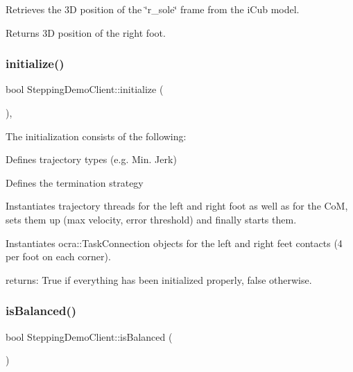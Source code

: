 Retrieves the 3D position of the \char`\"{}r\+\_\+sole\char`\"{} frame from the i\+Cub model.

\begin{DoxyReturn}{Returns}
3D position of the right foot. 
\end{DoxyReturn}
\hypertarget{classSteppingDemoClient_a08dce195eece162eed175ac9487667c2}{}\label{classSteppingDemoClient_a08dce195eece162eed175ac9487667c2} 
\subsubsection{\texorpdfstring{initialize()}{initialize()}}
{\footnotesize\ttfamily bool Stepping\+Demo\+Client\+::initialize (\begin{DoxyParamCaption}{ }\end{DoxyParamCaption})\hspace{0.3cm}{\ttfamily [protected]}, {\ttfamily [virtual]}}

The initialization consists of the following\+:
\begin{DoxyEnumerate}
\item Defines trajectory types (e.\+g. Min. Jerk)
\item Defines the termination strategy
\item Instantiates trajectory threads for the left and right foot as well as for the CoM, sets them up (max velocity, error threshold) and finally starts them.
\item Instantiates ocra\+::\+Task\+Connection objects for the left and right feet contacts (4 per foot on each corner).
\end{DoxyEnumerate}
\begin{DoxyItemize}
\item returns\+: True if everything has been initialized properly, false otherwise. 
\end{DoxyItemize}\hypertarget{classSteppingDemoClient_ad8fbc186267a47a73bb77e78199f2b8c}{}\label{classSteppingDemoClient_ad8fbc186267a47a73bb77e78199f2b8c} 
\subsubsection{\texorpdfstring{is\+Balanced()}{isBalanced()}}
{\footnotesize\ttfamily bool Stepping\+Demo\+Client\+::is\+Balanced (\begin{DoxyParamCaption}{ }\end{DoxyParamCaption})\hspace{0.3cm}{\ttfamily [private]}}

